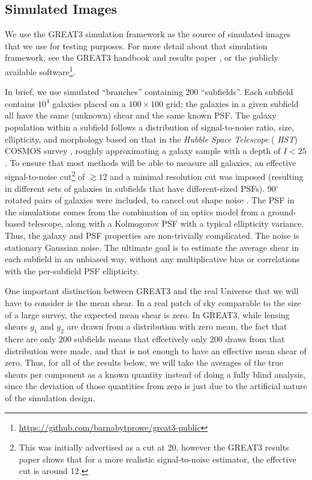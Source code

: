 \documentclass[iop]{emulateapj}
\begin{document}
\subsection{Simulated Images}

We use the GREAT3 simulation framework as the source of simulated
images that we use for testing purposes.  For more detail about that
simulation framework, see the GREAT3 handbook
\citep{2014ApJS..212....5M} and results paper
\citep{2015MNRAS.450.2963M}, or the publicly available
software\footnote{\url{https://github.com/barnabytprowe/great3-public}}.

In brief, we use simulated ``branches'' containing 200 ``subfields''.
Each subfield contains $10^4$ galaxies placed on a $100\times 100$
grid; the galaxies in a given subfield all have the same (unknown)
shear and the same known PSF.  The galaxy population within a subfield
follows a distribution of signal-to-noise ratio, size, ellipticity,
and morphology based on that in the {\it Hubble Space Telescope} ({\it
  HST}) COSMOS survey
\citep{2007ApJS..172..196K,2007ApJS..172....1S,2007ApJS..172...38S},
roughly approximating a galaxy sample with a depth of $I<25$.  To
ensure that most methods will be able to measure all galaxies, an
effective signal-to-noise cut\footnote{This was initially advertised as a cut at 20, however the
  GREAT3 results paper shows that for a more realistic signal-to-noise estimator, the effective cut
  is around 12.} of $\gtrsim 12$ and a minimal resolution
cut was imposed (resulting in different sets of galaxies in subfields
that have different-sized PSFs).  90$^\circ$ rotated pairs of galaxies
were included, to cancel out shape noise \citep{2007MNRAS.376...13M}.
The PSF in the simulations comes from the combination of an optics
model from a ground-based telescope, along with a Kolmogorov PSF with
a typical ellipticity variance.  Thus, the galaxy and PSF properties
are non-trivially complicated.  The noise is stationary Gaussian
noise.  The ultimate goal is to estimate the average shear in each
subfield in an unbiased way, without any multiplicative bias or
correlations with the per-subfield PSF ellipticity.

One important distinction between GREAT3 and the real Universe that we
will have to consider is the mean shear.  In a real patch of sky
comparable to the size of a large survey, the expected mean shear is
zero.  In GREAT3, while lensing shears $g_1$ and $g_2$ are drawn from
a distribution with zero mean, the fact that there are only 200
subfields means that effectively only 200 draws from that distribution
were made, and that is not enough to have an effective mean shear of
zero.  Thus, for all of the results below, we will take the averages
of the true shears per component as a known quantity instead of doing
a fully blind analysis, since the deviation of those quantities from
zero is just due to the artificial nature of the simulation design.
\end{document}
